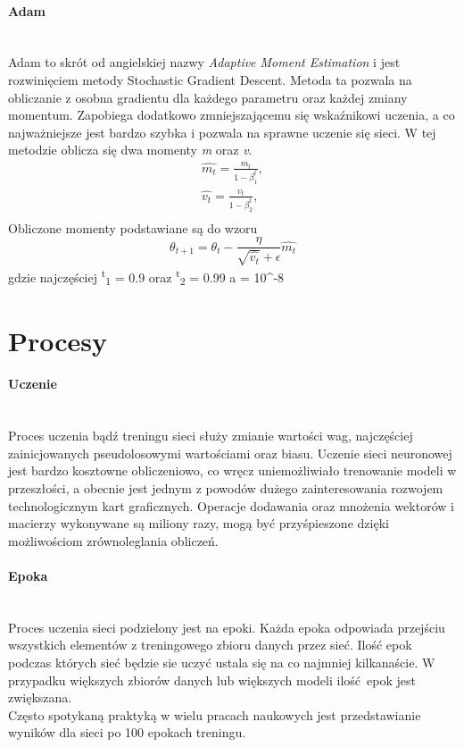 \paragraph{Adam} \mbox{}\\
Adam to skrót od angielskiej nazwy \textit{Adaptive Moment Estimation} i jest rozwinięciem
metody Stochastic Gradient Descent. Metoda ta pozwala na obliczanie z osobna gradientu dla
każdego parametru oraz każdej zmiany momentum. Zapobiega dodatkowo zmniejszającemu się
wskaźnikowi uczenia, a co najważniejsze jest bardzo szybka i pozwala na sprawne uczenie
się sieci. W tej metodzie oblicza się dwa momenty \textit{m} oraz \textit{v}.
\begin{equation}
\begin{align*}
\hat{m_t} = \frac{m_t} {1 - \beta^t_1}, \\
\hat{v_t} = \frac{v_t} {1 - \beta^t_2}, \\
\end{align*}
\end{equation}
Obliczone momenty podstawiane są do wzoru
\begin{equation}
\theta_{t+1} = \theta_t - \frac {\eta} {\sqrt{\hat{v_t}} + \epsilon} \hat{m_t}
\end{equation}
gdzie najczęściej \textbeta \textsuperscript{t}\textsubscript{1} = 0.9 oraz
\textbeta \textsuperscript{t}\textsubscript{2} = 0.99 a \straightepsilon = 10^{-8}\\

\section{Procesy}

\paragraph{Uczenie} \mbox{}\\
Proces uczenia bądź treningu sieci służy zmianie wartości wag, najczęściej zainicjowanych
pseudolosowymi wartościami oraz biasu. Uczenie sieci neuronowej jest bardzo
kosztowne obliczeniowo, co wręcz uniemożliwiało trenowanie modeli w przeszłości,
a obecnie jest jednym z powodów dużego zainteresowania rozwojem technologicznym kart
graficznych. Operacje dodawania oraz mnożenia wektorów i macierzy wykonywane są miliony razy,
mogą być przyśpieszone dzięki możliwościom zrównoleglania obliczeń.\\

\paragraph{Epoka} \mbox{}\\
Proces uczenia sieci podzielony jest na epoki. Każda epoka odpowiada przejściu
wszystkich elementów z treningowego zbioru danych przez sieć. Ilość epok podczas
których sieć będzie sie uczyć ustala się na co najmniej kilkanaście. W przypadku
większych zbiorów danych lub większych modeli ilość epok jest zwiększana.\\
Często spotykaną praktyką w wielu pracach naukowych jest przedstawianie wyników
dla sieci po 100 epokach treningu.

